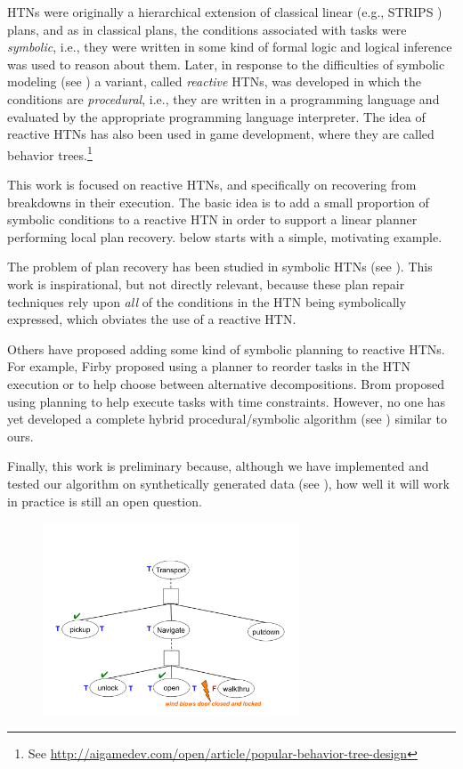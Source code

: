 \documentclass{llncs}
\begin{document}
HTNs were originally a hierarchical extension of classical linear
(e.g., STRIPS \cite{Strips}) plans, and as in classical plans, the
conditions associated with tasks were {\em symbolic}, i.e., they were
written in some kind of formal logic and logical inference was used to
reason about them.  Later, in response to the difficulties of symbolic
modeling (see ) a variant, called {\em reactive} HTNs,
was developed in which the conditions are {\em procedural}, i.e., they
are written in a programming language and evaluated by the appropriate
programming language interpreter.  The idea of reactive HTNs has also
been used in game development, where they are called behavior
trees.\footnote{See
  \url{http://aigamedev.com/open/article/popular-behavior-tree-design}}

This work is focused on reactive HTNs, and specifically on recovering
from breakdowns in their execution.  The basic idea is to add a small
proportion of symbolic conditions to a reactive HTN in order to
support a linear planner performing local plan
recovery.  below starts with a simple, motivating
example.

The problem of plan recovery has been studied in symbolic HTNs (see
\cite{AyanEtAl2007_HOTRiDE,BoellaDamiano2002,VanDerKrogtDeWeerdt2005,WarfieldEtAl2007}).
This work is inspirational, but not directly relevant, because these
plan repair techniques rely upon {\em all} of the conditions in the
HTN being symbolically expressed, which obviates the use of a reactive
HTN.

Others have proposed adding some kind of symbolic planning to reactive
HTNs.  For example, Firby \cite{Firby1987} proposed using a planner to
reorder tasks in the HTN execution or to help choose between
alternative decompositions. Brom \cite{Brom2005} proposed using
planning to help execute tasks with time constraints.  However, no one
has yet developed a complete hybrid procedural/symbolic algorithm (see
) similar to ours.

Finally, this work is preliminary because, although we have
implemented and tested our algorithm on synthetically generated data
(see ), how well it will work in practice is still an
open question.

\begin{figure}[t]
\centerline{\includegraphics[width=3in]{figs/wind}}
\vskip 8pt
\end{figure}
\end{document}
